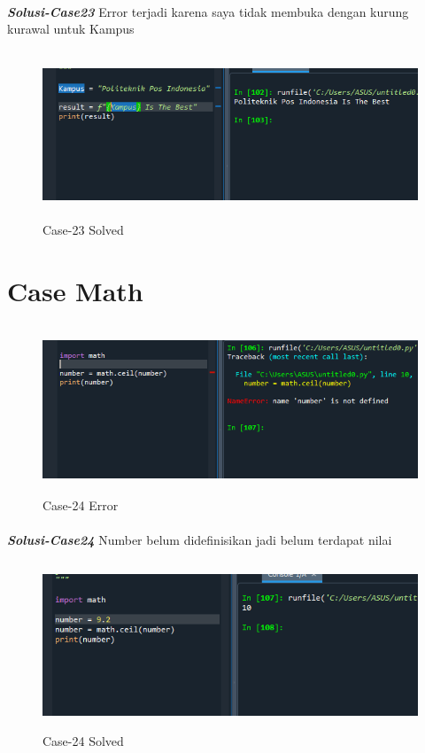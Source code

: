 \documentclass[12pt,a4paper]{article}
\begin{document}
\paragraph{}\textbf{\textit{Solusi-Case23}} {Error terjadi karena saya tidak membuka dengan kurung kurawal untuk Kampus}
\begin{figure}[ht]
    \centerline{\includegraphics[width=15cm,height=5cm]{image/case23-solved.png}}
    \renewcommand{\figurename}{Gambar}
    \caption{Case-23 Solved}
\end{figure}

\newpage
\section{Case Math}
\begin{figure}[ht]
    \centerline{\includegraphics[width=15cm,height=5cm]{image/case24.png}}
    \renewcommand{\figurename}{Gambar}
    \caption{Case-24 Error}
\end{figure}
\paragraph{}\textbf{\textit{Solusi-Case24}} {Number belum didefinisikan jadi belum terdapat nilai}
\begin{figure}[ht]
    \centerline{\includegraphics[width=15cm,height=5cm]{image/case24-solved.png}}
    \renewcommand{\figurename}{Gambar}
    \caption{Case-24 Solved}
\end{figure}
\end{document}
